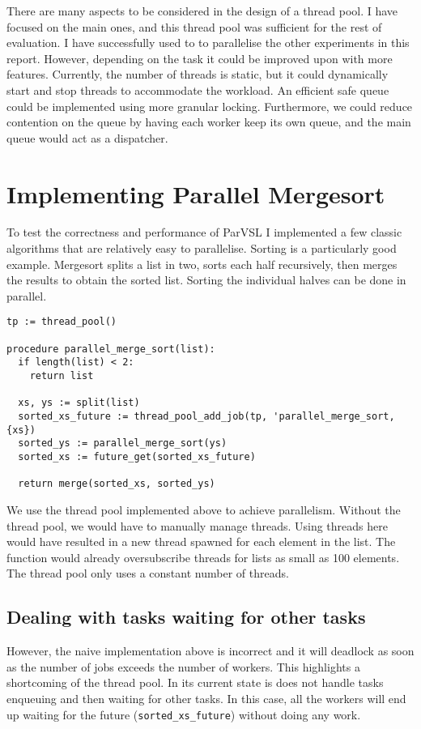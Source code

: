There are many aspects to be considered in the design of a thread pool. I have focused on the main ones, and
this thread pool was sufficient for the rest of evaluation. I have successfully used to to parallelise the
other experiments in this report. However, depending on the task it could be improved upon with more features.
Currently, the number of threads is static, but it could dynamically start and stop threads to accommodate
the workload. An efficient safe queue could be implemented using more granular locking. Furthermore, we could
reduce contention on the queue by having each worker keep its own queue, and the main queue would act as a
dispatcher.

\section{Implementing Parallel Mergesort}

To test the correctness and performance of ParVSL I implemented a few classic algorithms that are relatively
easy to parallelise. Sorting is a particularly good example. Mergesort splits a list in two, sorts each half
recursively, then merges the results to obtain the sorted list. Sorting the individual halves can be done
in parallel.

\begin{verbatim}
tp := thread_pool()

procedure parallel_merge_sort(list):
  if length(list) < 2:
    return list

  xs, ys := split(list)
  sorted_xs_future := thread_pool_add_job(tp, 'parallel_merge_sort, {xs})
  sorted_ys := parallel_merge_sort(ys)
  sorted_xs := future_get(sorted_xs_future)

  return merge(sorted_xs, sorted_ys)
\end{verbatim}

We use the thread pool implemented above to achieve parallelism. Without the thread pool, we would
have to manually manage threads. Using threads here would have resulted in a new thread spawned for
each element in the list. The function would already oversubscribe threads for lists as small as
100 elements. The thread pool only uses a constant number of threads.

\subsection{Dealing with tasks waiting for other tasks}

However, the naive implementation above is incorrect and it will deadlock as soon as the number of
jobs exceeds the number of workers. This highlights a shortcoming of the thread pool. In its current
state is does not handle tasks enqueuing and then waiting for other tasks. In this case, all the workers
will end up waiting for the future (\verb|sorted_xs_future|) without doing any work.

